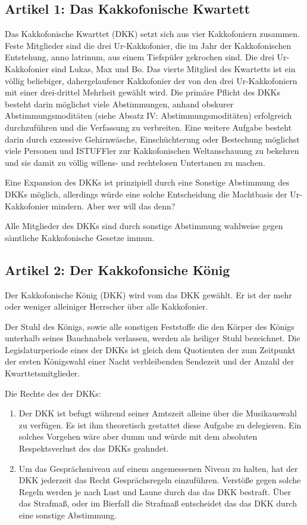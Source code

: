 \documentclass[ngerman, fontsize=12pt, parskip=half, footsepline]{scrartcl}
\begin{document}
\subsection*{Artikel 1: Das Kakkofonische Kwartett}
Das Kakkofonische Kwarttet (DKK) setzt sich aus vier Kakkofoniern zusammen. Feste Mitglieder sind die drei Ur-Kakkofonier, die im Jahr der Kakkofonischen Entstehung, anno latrinum, aus einem Tiefspüler gekrochen sind. Die drei Ur-Kakkofonier sind Lukas, Max und Bo. Das vierte Mitglied des Kwartetts ist ein völlig beliebiger, dahergelaufener Kakkofonier der von den drei Ur-Kakkofoniern mit einer drei-drittel Mehrheit gewählt wird. Die primäre Pflicht des DKKs besteht darin möglichst viele Abstimmungen, anhand obskurer Abstimmungsmoditäten (siehe Absatz IV: Abstimmungsmoditäten) erfolgreich durchzuführen und die Verfassung zu verbreiten. Eine weitere Aufgabe besteht darin durch exzessive Gehirnwäsche, Einschüchterung oder Bestechung möglichst viele Personen und ISTUFFler zur Kakkofonischen Weltanschauung zu bekehren und sie damit zu völlig willens- und rechtelosen Untertanen zu machen.

Eine Expansion des DKKs ist prinzipiell durch eine Sonstige Abstimmung des DKKs möglich, allerdings würde eine solche Entscheidung die Machtbasis der Ur-Kakkofonier mindern. Aber wer will das denn?

Alle Mitglieder des DKKs sind durch sonstige Abstimmung wahlweise gegen sämtliche Kakkofonische Gesetze immun.

\subsection*{Artikel 2: Der Kakkofonsiche König}
Der Kakkofonische König (DKK) wird vom das DKK gewählt. Er ist der mehr oder weniger alleiniger Herrscher über alle Kakkofonier.

Der Stuhl des Königs, sowie alle sonstigen Feststoffe die den Körper des Königs unterhalb seines Bauchnabels verlassen, werden als heiliger Stuhl bezeichnet.
Die Legislaturperiode eines der DKKs ist gleich dem Quotienten der zum Zeitpunkt der ersten Königswahl einer Nacht verbleibenden Sendezeit und der Anzahl der Kwarttetsmitglieder.

Die Rechte des der DKKs:
\begin{enumerate}
	\item Der DKK ist befugt während seiner Amtszeit alleine über die Musikauswahl zu verfügen. Es ist ihm theoretisch gestattet diese Aufgabe zu delegieren. Ein solches Vorgehen wäre aber dumm und würde mit dem absoluten Respektsverlust des das DKKs geahndet.

	\item Um das Gesprächsniveau auf einem angemessenen Niveau zu halten, hat der DKK jederzeit das Recht Gesprächsregeln einzuführen. Verstöße gegen solche Regeln werden je nach Lust und Laune durch das das DKK bestraft. Über das Strafmaß, oder im Bierfall die Strafmaß entscheidet das das DKK durch eine sonstige Abstimmung.
\end{enumerate}
\end{document}
